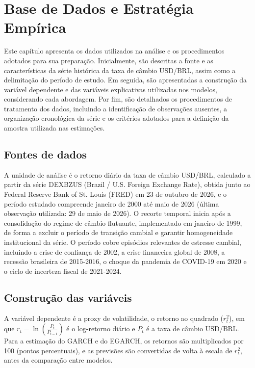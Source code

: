 \chapter{Base de Dados e Estratégia Empírica}

Este capítulo apresenta os dados utilizados na análise e os procedimentos adotados para sua preparação. Inicialmente, são descritas a fonte e as características da série histórica 
da taxa de câmbio USD/BRL, assim como a delimitação do período de estudo. Em seguida, são apresentadas a construção da variável dependente e das variáveis explicativas utilizadas 
nos modelos, considerando cada abordagem. Por fim, são detalhados os procedimentos de tratamento dos dados, incluindo a identificação de observações ausentes, a organização cronológica 
da série e os critérios adotados para a definição da amostra utilizada nas estimações.

\section{Fontes de dados}

A unidade de análise é o retorno diário da taxa de câmbio USD/BRL, calculado a partir da série DEXBZUS (Brazil / U.S. Foreign Exchange Rate), obtida junto ao Federal Reserve 
Bank of St. Louis (FRED) em 23 de outubro de 2026, e o período estudado compreende janeiro de 2000 até maio de 2026 
(última observação utilizada: 29 de maio de 2026). O recorte temporal inicia após a 
consolidação do regime de câmbio flutuante, implementado em janeiro de 1999, de forma a excluir o período de transição cambial e 
garantir homogeneidade institucional da série. O período cobre episódios relevantes de estresse cambial, incluindo a crise de 
confiança de 2002, a crise financeira global de 2008, a recessão brasileira de 2015-2016, o choque da pandemia de COVID-19 em 2020
 e o ciclo de incerteza fiscal de 2021-2024.

\section{Construção das variáveis}

A variável dependente é a proxy de volatilidade, o retorno ao quadrado ($r_t^2$), em que $r_t = \ln\left(\frac{P_t}{P_{t-1}}\right)$ é o log-retorno diário e $P_t$ é 
a taxa de câmbio USD/BRL. Para a estimação do GARCH e do EGARCH, os retornos são multiplicados por 100 (pontos percentuais), e as previsões são convertidas de volta à 
escala de $r_t^2$, antes da comparação entre modelos.

